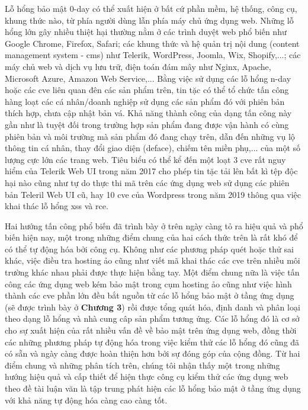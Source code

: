 Lỗ hổng bảo mật 0-day có thể xuất hiện ở bất cứ phần mềm, hệ thống, công cụ, khung thức nào, từ phía người dùng lẫn phía máy chủ ứng dụng web. Những lỗ hổng lớn gây nhiều thiệt hại thường nằm ở các trình duyệt web phổ biến như Google Chrome, Firefox, Safari; các khung thức và hệ quản trị nội dung (content management system - \acrshort{cms}) như Telerik, WordPress, Joomla, Wix, Shopify,...; các máy chủ web và dịch vụ lưu trữ, điện toán đám mây như Nginx, Apache, Microsoft Azure, Amazon Web Service,... Bằng việc sử dụng các lỗ hổng n-day hoặc các \acrshort{cve} liên quan đên các sản phẩm trên, tin tặc có thể tổ chức tấn công hàng loạt các cá nhân/doanh nghiệp sử dụng các sản phẩm đó với phiên bản thích hợp, chưa cập nhật bản vá. Khả năng thành công của dạng tấn công này gần như là tuyệt đối trong trường hợp sản phẩm đang được vận hành có cùng phiên bản và môi trường mà sản phẩm đó đang chạy trên, dẫn đến những vụ lộ thông tin cá nhân, thay đổi giao diện (deface), chiếm tên miền phụ,... của một số lượng cực lớn các trang web. Tiêu biểu có thể kể đến một loạt 3 \acrshort{cve} rất nguy hiểm của Telerik Web UI \parencite{telerik-CVEs} trong năm 2017 cho phép tin tặc tải lên bất kì tệp độc hại nào cũng như tự do thực thi mã trên các ứng dụng web sử dụng các phiên bản Teleril Web UI cũ, hay 10 \acrshort{cve} của Wordpress \parencite{wordpress-CVEs} trong năm 2019 thông qua việc khai thác lỗ hổng \acrshort{xss} và \acrshort{rce}.\par
Hai hướng tấn công phổ biến đã trình bày ở trên ngày càng tỏ ra hiệu quả và phổ biến hiện nay, một trong những điểm chung của hai cách thức trên là rất khó để có thể tự động hóa bởi công cụ. Không như các phương pháp quét hoặc thử sai khác, việc điều tra hosting ảo cũng như viết mã khai thác các \acrshort{cve} trên nhiều môi trường khác nhau phải được thực hiện bằng tay. Một điểm chung nữa là việc tấn công các ứng dụng web kém bảo mật trong cụm hosting ảo cũng như việc hình thành các \acrshort{cve} phần lớn đều bắt nguồn từ các lỗ hổng bảo mật ở tầng ứng dụng (sẽ được trình bày ở \textbf{Chương 3}) rồi được tổng quát hóa, định danh và phân loại theo dạng lỗ hổng và nhà cung câp sản phẩm tương ứng. Các lỗ hổng đó là cơ sở cho sự xuất hiện của rất nhiều vấn đề về bảo mật trên ứng dụng web, đồng thời các những phương pháp tự động hóa trong việc kiểm thử các lỗ hổng đó cũng đã có sẵn và ngày càng được hoàn thiện hơn bởi sự đóng góp của cộng đồng. Từ hai điểm chung và những phân tích trên, chúng tôi nhận thấy một trong những hướng hiệu quả và cấp thiết để hiện thực công cụ kiểm thử các ứng dụng web theo đề tài luận văn là tập trung phát hiện các lỗ hổng bảo mật ở tầng ứng dụng với khả năng tự động hóa càng cao càng tốt.
